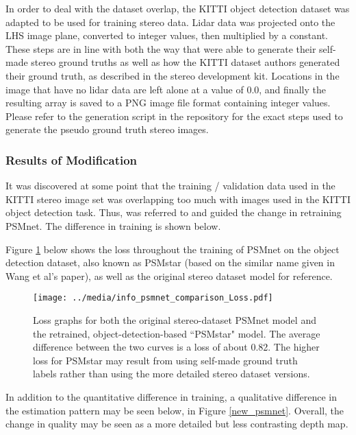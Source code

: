 In order to deal with the dataset overlap, the KITTI object detection dataset was adapted to be used for training stereo data. Lidar data was projected onto the LHS image plane, converted to integer values, then multiplied by a constant. These steps are in line with both the way that \cite{wang_pseudo-lidar_2019} were able to generate their self-made stereo ground truths as well as how the KITTI dataset authors generated their ground truth, as described in the stereo development kit. Locations in the image that have no lidar data are left alone at a value of 0.0, and finally the resulting array is saved to a PNG image file format containing integer values. Please refer to the generation script in the repository for the exact steps used to generate the pseudo ground truth stereo images.

\subsubsection{Results of Modification}
It was discovered at some point that the training / validation data used in the KITTI stereo image set was overlapping too much with images used in the KITTI object detection task. Thus, \cite{wang_pseudo-lidar_2019} was referred to and guided the change in retraining PSMnet. The difference in training is shown below.

Figure \ref{psmnet_star_train_info} below shows the loss throughout the training of PSMnet on the object detection dataset, also known as PSMstar (based on the similar name given in Wang et al's paper), as well as the original stereo dataset model for reference. 

\begin{figure}[ht]
	\centering
	\texttt{[image: ../media/info\_psmnet\_comparison\_Loss.pdf]}
	\caption{Loss graphs for both the original stereo-dataset PSMnet model and the retrained, object-detection-based ``PSMstar" model. The average difference between the two curves is a loss of about 0.82. The higher loss for PSMstar may result from using self-made ground truth labels rather than using the more detailed stereo dataset versions.}
	\label{psmnet_star_train_info}
\end{figure}

In addition to the quantitative difference in training, a qualitative difference in the estimation pattern may be seen below, in Figure \ref{new_psmnet}. Overall, the change in quality may be seen as a more detailed but less contrasting depth map.

